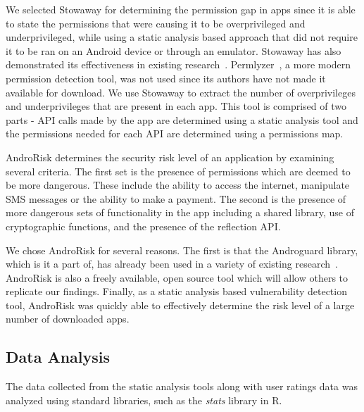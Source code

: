 \documentclass{sig-alternate}
\begin{document}
We selected Stowaway for determining the permission gap in apps since it is able to state the permissions that were causing it to be overprivileged and underprivileged, while using a static analysis based approach that did not require it to be ran on an Android device or through an emulator. Stowaway has also demonstrated its effectiveness in existing research~\cite{Stevens:2013:APU:2487085.2487093, Felt:2011:APD:2046707.2046779, Pearce:2012:APS:2414456.2414498}. Permlyzer~\cite{6698893}, a more modern permission detection tool, was not used since its authors have not made it available for download. We use Stowaway to extract the number of overprivileges and underprivileges that are present in each app. This tool is comprised of two parts - API calls made by the app are determined using a static analysis tool and the permissions needed for each API are determined using a permissions map.

AndroRisk determines the security risk level of an application by examining several criteria. The first set is the presence of permissions which are deemed to be more dangerous. These include the ability to access the internet, manipulate SMS messages or the ability to make a payment. The second is the presence of more dangerous sets of functionality in the app including a shared library, use of cryptographic functions, and the presence of the reflection API.

We chose AndroRisk for several reasons. The first is that the Androguard library, which is it a part of, has already been used in a variety of existing research~\cite{Egele:2013:ESC:2508859.2516693, Vidas:2014:AAA:2666620.2666630, Atzeni:2014:DYA:2692983.2693001}. AndroRisk is also a freely available, open source tool which will allow others to replicate our findings. Finally, as a static analysis based vulnerability detection tool, AndroRisk was quickly able to effectively determine the risk level of a large number of downloaded apps.




\subsection{Data Analysis}

The data collected from the static analysis tools along with user ratings data was analyzed using standard libraries, such as the {\it stats} library in R.
\end{document}
